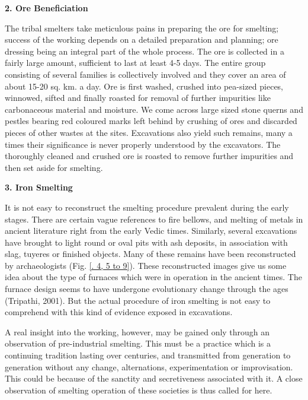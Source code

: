 \noindent \textbf{\large 2. Ore Beneficiation}

The tribal smelters take meticulous pains in preparing the ore for smelting; success of the working depends on a detailed preparation and planning; ore dressing being an integral part of the whole process. The ore is collected in a fairly large amount, sufficient to last at least 4-5 days. The entire group consisting of several families is collectively involved and they cover an area of about 15-20 sq. km. a day. Ore is first washed, crushed into pea-sized pieces, winnowed, sifted and finally roasted for removal of further impurities like carbonaceous material and moisture. We come across large sized stone querns and pestles bearing red coloured marks left behind by crushing of ores and discarded pieces of other wastes at the sites. Excavations also yield such remains, many a times their significance is never properly understood by the excavators. The thoroughly cleaned and crushed ore is roasted to remove further impurities and then set aside for smelting.

\noindent \textbf{\large 3. Iron Smelting}

It is not easy to reconstruct the smelting procedure prevalent during the early stages. There are certain vague references to fire bellows, and melting of metals in ancient literature right from the early Vedic times. Similarly, several excavations have brought to light round or oval pits with ash deposits, in association with slag, tuyeres or finished objects. Many of these remains have been reconstructed by archaeologists (Fig. \ref{. 4, 5 to 9}). These reconstructed images give us some idea about the type of furnaces which were in operation in the ancient times. The furnace design seems to have undergone evolutionary change through the ages (Tripathi, 2001). But the actual procedure of iron smelting is not easy to comprehend with this kind of evidence exposed in excavations.

A real insight into the working, however, may be gained only through an observation of pre-industrial smelting. This must be a practice which is a continuing tradition lasting over centuries, and transmitted from generation to generation without any change, alternations, experimentation or improvisation. This could be because of the sanctity and secretiveness associated with it. A close observation of smelting operation of these societies is thus called for here.

